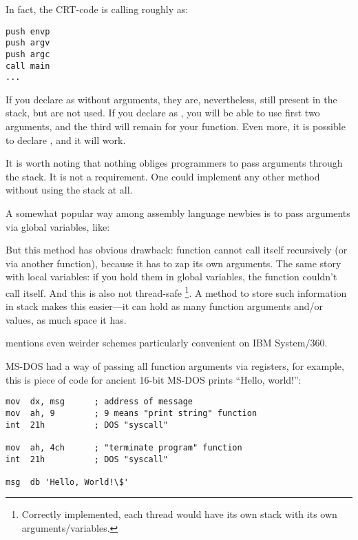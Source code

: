 In fact, the \ac{CRT}-code is calling \main roughly as:
	
\begin{lstlisting}[style=customasmx86]
push envp
push argv
push argc
call main
...
\end{lstlisting}

If you declare \main as \main without arguments, they are, nevertheless, still present in the stack, but are not used.
If you declare \main as  ,
you will be able to use first two arguments, and the third will remain  for your function.
Even more, it is possible to declare , and it will work.


It is worth noting that nothing obliges programmers to pass arguments through the stack. It is not a requirement.
One could implement any other method without using the stack at all.

A somewhat popular way among assembly language newbies is to pass arguments via global variables, like:



But this method has obvious drawback:  function cannot call itself recursively (or via another function),
because it has to zap its own arguments.
The same story with local variables: if you hold them in global variables, the function couldn't call itself.
And this is also not thread-safe
\footnote{Correctly implemented, each thread would have its own stack with its own arguments/variables.}.
A method to store such information in stack makes this easier---it can hold as many function arguments and/or values,
as much space it has.

 mentions even weirder schemes particularly convenient on IBM System/360.


MS-DOS had a way of passing all function arguments via registers, for example, this is piece of
code for ancient 16-bit MS-DOS prints ``Hello, world!'':

\begin{lstlisting}[style=customasmx86]
mov  dx, msg      ; address of message
mov  ah, 9        ; 9 means "print string" function
int  21h          ; DOS "syscall"

mov  ah, 4ch      ; "terminate program" function
int  21h          ; DOS "syscall"

msg  db 'Hello, World!\$'
\end{lstlisting}


